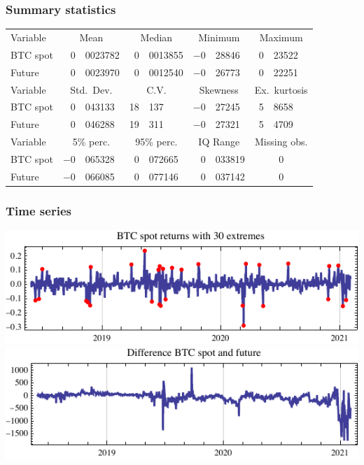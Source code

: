 \documentclass[10pt,mathserif,notes=show]{beamer}
\renewcommand{\(}{\begin{columns}}
\renewcommand{\)}{\end{columns}}
\newcommand{\<}[1]{\begin{column}{#1}}
\renewcommand{\>}{\end{column}}
\theoremstyle{definition}
\begin{document}
\begin{frame}
  \frametitle{Summary statistics}
  {\small%
\begin{center}

\begin{tabular}{lr@{.}lr@{.}lr@{.}lr@{.}l}
Variable & \multicolumn{2}{c}{Mean}
 & \multicolumn{2}{c}{Median}
  & \multicolumn{2}{c}{Minimum}
   & \multicolumn{2}{c}{Maximum} \\[1ex]
BTC spot& 0&0023782 & 0&0013855 & $-$0&28846 & 0&23522\\
Future & 0&0023970 & 0&0012540 & $-$0&26773 & 0&22251\\[10pt]

Variable &  \multicolumn{2}{c}{Std.\ Dev.}
 & \multicolumn{2}{c}{C.V.}
  & \multicolumn{2}{c}{Skewness}
   & \multicolumn{2}{c}{Ex.\ kurtosis} \\[1ex]
BTC spot & 0&043133 & 18&137 & $-$0&27245 & 5&8658\\
Future & 0&046288 & 19&311 & $-$0&27321 & 5&4709\\[10pt]

Variable &  \multicolumn{2}{c}{5\% perc.}
 & \multicolumn{2}{c}{95\% perc.}
  & \multicolumn{2}{c}{IQ Range}
   & \multicolumn{2}{c}{Missing obs.} \\[1ex]
BTC spot & $-$0&065328 & 0&072665 & 0&033819 & \multicolumn{2}{c}{0}\\
Future & $-$0&066085 & 0&077146 & 0&037142 & \multicolumn{2}{c}{0}\\
\end{tabular}
\end{center}
}
\end{frame}

\begin{frame}
  \frametitle{Time series}
  \begin{center}
    \includegraphics[scale=1]{../_pics/btc_series.pdf}\\
    \includegraphics[scale=1]{../_pics/btc_vs_future_series.pdf}    
  \end{center}
\end{frame}
\end{document}
